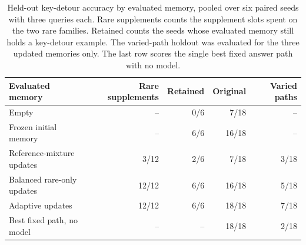 \begin{table}[t]
\centering
\caption{Held-out key-detour accuracy by evaluated memory, pooled over six
paired seeds with three queries each. Rare supplements counts the
supplement slots spent on the two rare families. Retained counts the seeds
whose evaluated memory still holds a key-detour example. The varied-path
holdout was evaluated for the three updated memories only. The last row
scores the single best fixed answer path with no model.}
\label{tab:summary}
\begin{tabular}{lrrrr}
\toprule
Evaluated memory & Rare supplements & Retained & Original & Varied paths \\
\midrule
Empty & -- & 0/6 & 7/18 & -- \\
Frozen initial memory & -- & 6/6 & 16/18 & -- \\
Reference-mixture updates & 3/12 & 2/6 & 7/18 & 3/18 \\
Balanced rare-only updates & 12/12 & 6/6 & 16/18 & 5/18 \\
Adaptive updates & 12/12 & 6/6 & 18/18 & 7/18 \\
\addlinespace
Best fixed path, no model & -- & -- & 18/18 & 2/18 \\
\bottomrule
\end{tabular}
\end{table}
